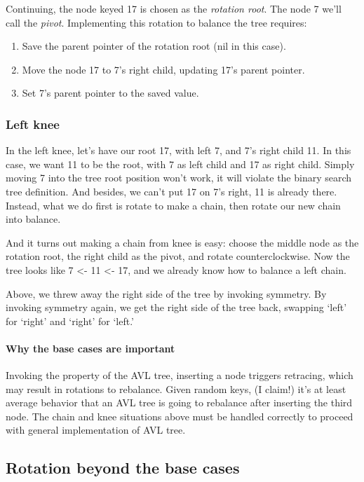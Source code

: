 \documentclass{article}
\begin{document}
Continuing, the node keyed 17 is chosen as the \textit{rotation root}.
The node 7 we'll call the \textit{pivot}. Implementing this rotation
to balance the tree requires:

\begin{enumerate}
  \item Save the parent pointer of the rotation root (nil in this case).
  \item Move the node 17 to 7's right child, updating 17's parent pointer.
  \item Set 7's parent pointer to the saved value.
\end{enumerate}

\subsubsection{Left knee}

In the left knee, let's have our root 17, with left 7, and 7's right
child 11. In this case, we want 11 to be the root, with 7 as left
child and 17 as right child. Simply moving 7 into the tree root
position won't work, it will violate the binary search tree definition.
And besides, we can't put 17 on 7's right, 11 is already there.
Instead, what we do first is rotate to make a chain, then rotate
our new chain into balance.

And it turns out making a chain from knee is easy: choose the middle
node as the rotation root, the right child as the pivot, and rotate
counterclockwise. Now the tree looks like 7 <- 11 <- 17, and we
already know how to balance a left chain.



Above, we threw away the right side of the tree by invoking symmetry.
By invoking symmetry again, we get the right side of the tree back,
swapping `left' for `right' and `right' for `left.'


\paragraph{Why the base cases are important}
Invoking the property of the AVL tree, inserting a node triggers retracing,
which may result in rotations to rebalance.  Given random keys, (I claim!) it's
at least average behavior that an AVL tree is going to rebalance after
inserting the third node. The chain and knee situations above must be handled
correctly to proceed with general implementation of AVL tree.


\subsection{Rotation beyond the base cases}
\end{document}
